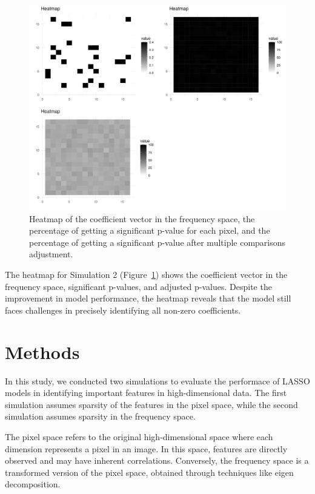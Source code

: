 \documentclass[12pt]{article}
\begin{document}
\begin{figure}[H]
  \centering
  \includegraphics[width=\textwidth]{../Figures/sim2_heatmap.png}
  \caption{Heatmap of the coefficient vector in the frequency space, the percentage of getting a significant p-value for each pixel, and the percentage of getting a significant p-value after multiple comparisons adjustment.}
  \label{fig:sim2_heatmap}
\end{figure}

The heatmap for Simulation 2 (Figure~\ref{fig:sim2_heatmap}) shows the coefficient vector in the frequency space, significant p-values, and adjusted p-values. Despite the improvement in model performance, the heatmap reveals that the model still faces challenges in precisely identifying all non-zero coefficients.

\clearpage

\section*{Methods}

In this study, we conducted two simulations to evaluate the performace of LASSO models in identifying important features in high-dimensional data. The first simulation assumes sparsity of the features in the pixel space, while the second simulation assumes sparsity in the frequency space.

The pixel space refers to the original high-dimensional space where each dimension represents a pixel in an image. In this space, features are directly observed and may have inherent correlations. Conversely, the frequency space is a transformed version of the pixel space, obtained through techniques like eigen decomposition.
\end{document}
